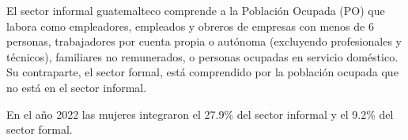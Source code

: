El sector informal guatemalteco comprende a la Población Ocupada (PO) que labora como empleadores, empleados y obreros de empresas con menos de 6 personas, trabajadores por cuenta propia o autónoma (excluyendo profesionales y técnicos), familiares no remunerados, o personas ocupadas en servicio doméstico. Su contraparte, el sector formal, está comprendido por la población ocupada que no está en el sector informal. 

En el año 2022 las mujeres integraron el 27.9\% del sector informal y el 9.2\% del sector formal. 